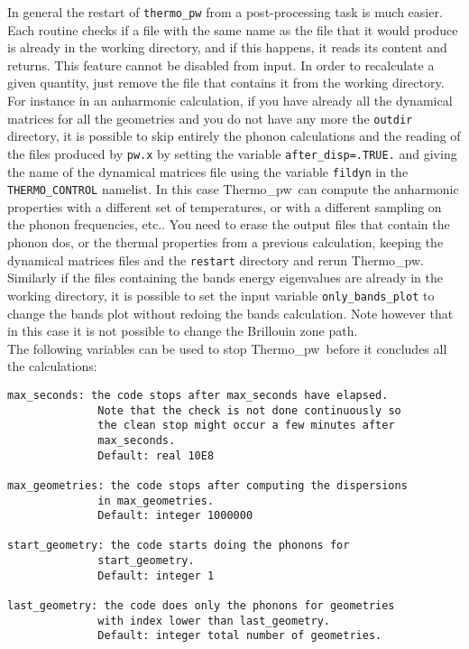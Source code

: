 \documentclass[12pt,a4paper,twoside]{report}
\def\thermo{{\sc Thermo}\_{\sc pw}}
\begin{document}
In general the restart of \texttt{thermo\_pw} from a post-processing task
is much easier.
Each routine checks if a file with the same name
as the file that it would produce is already in the working directory,
and if this happens, it reads its content and returns. This feature cannot be
disabled from input. In order to recalculate a given quantity, just remove
the file that contains it from the working directory.
For instance in an anharmonic calculation, if you have already all 
the dynamical 
matrices for all the geometries and you do not have any more the
\texttt{outdir} directory, it is possible to skip entirely
the phonon calculations and the reading of the files produced by
\texttt{pw.x} by setting the variable
\texttt{after\_disp=.TRUE.} and giving the name of the dynamical matrices file
using the variable \texttt{fildyn} in the \texttt{THERMO\_CONTROL} namelist. 
In this case \thermo\ can compute the anharmonic properties with a 
different set 
of temperatures, or with a different sampling on the phonon frequencies, 
etc.. You need to erase the output files that contain
the phonon dos, or the thermal properties from a previous calculation, keeping 
the dynamical matrices files and the \texttt{restart} directory and 
rerun \thermo.
Similarly if the files containing the bands energy eigenvalues are already
in the working directory, it is possible to set the input variable
\texttt{only\_bands\_plot} to change the bands plot without redoing the
bands calculation. Note however that in this case it is not possible 
to change the Brillouin zone path. \\
The following variables can be used to stop \thermo\ before it concludes all
the calculations:

\begin{verbatim}
max_seconds: the code stops after max_seconds have elapsed. 
              Note that the check is not done continuously so 
              the clean stop might occur a few minutes after 
              max_seconds.
              Default: real 10E8

max_geometries: the code stops after computing the dispersions 
              in max_geometries.
              Default: integer 1000000

start_geometry: the code starts doing the phonons for 
              start_geometry.
              Default: integer 1

last_geometry: the code does only the phonons for geometries 
              with index lower than last_geometry.
              Default: integer total number of geometries.
\end{verbatim}
\end{document}
